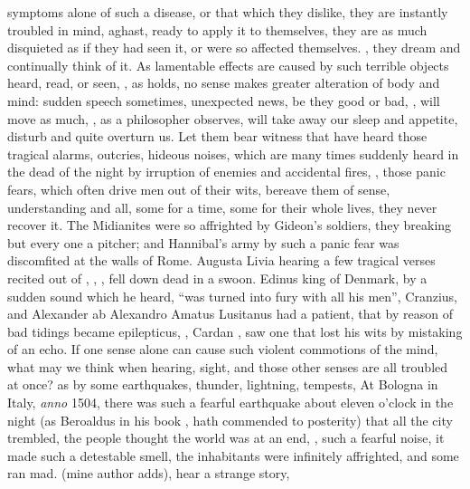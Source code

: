 symptoms alone of such a disease, or that which they dislike, they are
instantly troubled in mind, aghast, ready to apply it to themselves, they are
as much disquieted as if they had seen it, or were so affected themselves.
, they dream and continually think of it. As
lamentable effects are caused by such terrible objects heard, read, or seen,
, as \Plutarch{}
holds, no sense makes greater alteration of body and mind: sudden speech
sometimes, unexpected news, be they good or bad, ,
will move as much, , as a
philosopher observes, will take away our sleep and
appetite, disturb and quite overturn us. Let them bear witness that have heard
those tragical alarms, outcries, hideous noises, which are many times suddenly
heard in the dead of the night by irruption of enemies and accidental fires,
\etc{}, those panic fears, which often drive men out of
their wits, bereave them of sense, understanding and all, some for a time, some
for their whole lives, they never recover it. The
Midianites were so affrighted by Gideon's soldiers, they
breaking but every one a pitcher; and Hannibal's army by
such a panic fear was discomfited at the walls of Rome. Augusta Livia hearing a
few tragical verses recited out of \Virgil{}, , \etc{}, fell
down dead in a swoon. Edinus king of Denmark, by a sudden sound which he heard,
\enquote{was turned into fury with all his men}, Cranzius,
 and Alexander ab Alexandro
 Amatus Lusitanus had a patient, that by
reason of bad tidings became epilepticus, , Cardan , saw one that lost his wits
by mistaking of an echo. If one sense alone can cause such violent commotions
of the mind, what may we think when hearing, sight, and those other senses are
all troubled at once? as by some earthquakes, thunder, lightning, tempests,
\etc{} At Bologna in Italy, \emph{anno} 1504, there was such a fearful
earthquake about eleven o'clock in the night (as Beroaldus
in his book , hath commended to posterity)
that all the city trembled, the people thought the world was at an end,
, such a fearful noise, it made such a detestable
smell, the inhabitants were infinitely affrighted, and some ran mad.  (mine author adds), hear a strange story,
